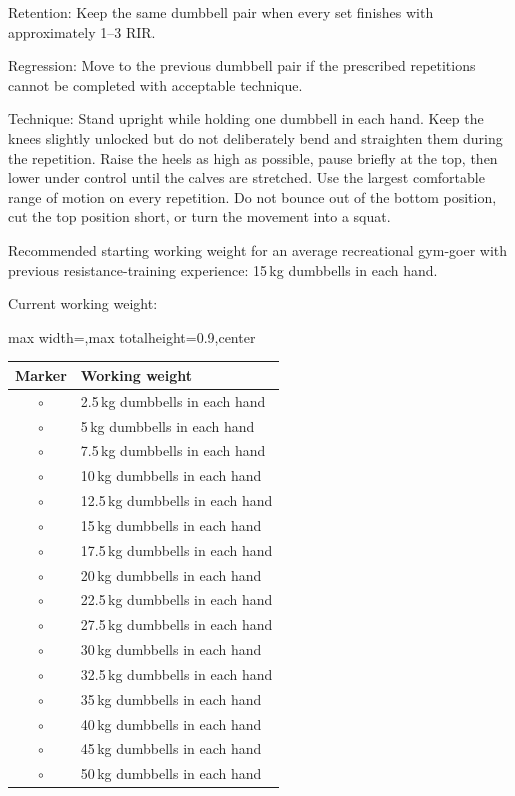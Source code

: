 \documentclass[11pt,a4paper]{article}
\newcommand{\tablearraystretch}{1.15}
\begin{document}
Retention: Keep the same dumbbell pair when every set finishes with approximately 1--3 RIR.

Regression: Move to the previous dumbbell pair if the prescribed repetitions cannot be completed with acceptable technique.

Technique: Stand upright while holding one dumbbell in each hand. Keep the knees slightly unlocked but do not deliberately bend and straighten them during the repetition. Raise the heels as high as possible, pause briefly at the top, then lower under control until the calves are stretched. Use the largest comfortable range of motion on every repetition. Do not bounce out of the bottom position, cut the top position short, or turn the movement into a squat.

Recommended starting working weight for an average recreational gym-goer with previous resistance-training experience: 15\,kg dumbbells in each hand.

Current working weight:

\begin{center}
\renewcommand{\arraystretch}{\tablearraystretch}
\begin{adjustbox}{max width=\linewidth,max totalheight=0.9\textheight,center}
\begin{tabular}{cl}
\toprule
Marker & Working weight \\
\midrule
$\circ$ & 2.5\,kg dumbbells in each hand \\
$\circ$ & 5\,kg dumbbells in each hand \\
$\circ$ & 7.5\,kg dumbbells in each hand \\
$\circ$ & 10\,kg dumbbells in each hand \\
$\circ$ & 12.5\,kg dumbbells in each hand \\
$\circ$ & 15\,kg dumbbells in each hand \\
$\circ$ & 17.5\,kg dumbbells in each hand \\
$\circ$ & 20\,kg dumbbells in each hand \\
$\circ$ & 22.5\,kg dumbbells in each hand \\
$\circ$ & 27.5\,kg dumbbells in each hand \\
$\circ$ & 30\,kg dumbbells in each hand \\
$\circ$ & 32.5\,kg dumbbells in each hand \\
$\circ$ & 35\,kg dumbbells in each hand \\
$\circ$ & 40\,kg dumbbells in each hand \\
$\circ$ & 45\,kg dumbbells in each hand \\
$\circ$ & 50\,kg dumbbells in each hand \\
\bottomrule
\end{tabular}
\end{adjustbox}
\renewcommand{\arraystretch}{1}
\end{center}
\end{document}
